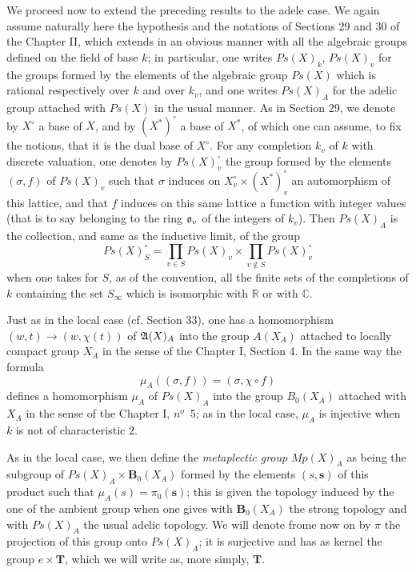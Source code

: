 \documentclass[12pt]{amsart}
\newcounter{ssection}
\renewcommand{\subsection}{
  \addtocounter{ssection}{1}{\bf  \arabic{ssection}.\  }}
\begin{document}
\subsection{}
We proceed now to extend the preceding results to the adele case.
We again assume naturally here the hypothesis and the notations of
Sections 29 and 30 of the Chapter II, which extends in an obvious
manner with all the algebraic groups defined on the field of base
$k$; in particular, one writes $Ps(X)_{k}$, $Ps(X)_{v}$ for the
groups formed by the elements of the algebraic group $Ps(X)$ which
is rational respectively over $k$ and over $k_{v}$, and one writes
$Ps(X)_{A}$ for the adelic group attached with $Ps(X)$ in the usual
manner. As in Section 29, we denote by $X^\circ$ a base of $X$, and
by $(X^*)^\circ$ a base of $X^*$, of which one can assume, to fix the
notions, that it is the dual base of $X^\circ$. For any completion
$k_{v}$ of $k$ with discrete valuation, one denotes by $Ps(X)_{v}^\circ$
the group formed by the elements $(\sigma,f)$ of $Ps(X)_{v}$ such
that $\sigma$ induces on $X_{v}^\circ\times(X^*)_{v}^\circ$ an automorphism
of this lattice, and that $f$ induces on this same lattice a function
with integer values (that is to say belonging to the ring $\mathfrak{o}_{v}$
of the integers of $k_{v}$). Then $Ps(X)_{A}$ is the collection,
and same as the inductive limit, of the group
\[
Ps(X)_{S}^\circ=\prod_{v\in S}Ps(X)_{v}\times\prod_{v\notin S}Ps(X)_{v}^\circ
\]
when one takes for $S$, as of the convention, all the finite sets
of the completions of $k$ containing the set $S_{\infty}$ which
is isomorphic with $\mathbb{R}$ or with $\mathbb{C}$.

Just as in the local case (cf. Section 33), one has a homomorphism
$(w,t)\to(w,\chi(t))$ of ${\mathfrak{A}}(X)_{A}$ into the group $A(X_{A})$
attached to locally compact group $X_{A}$ in the sense of the Chapter
I, Section 4. In the same way the formula\[
\mu_{A}((\sigma,f))=(\sigma,\chi\circ f)\]
defines a homomorphism $\mu_{A}$ of $Ps(X)_{A}$ into the group $B_{0}(X_{A})$
attached with $X_{A}$ in the sense of the Chapter I, $n^o$~5;
as in the local case, $\mu_{A}$ is injective when $k$ is not of
characteristic $2$.

As in the local case, we then define the \emph{metaplectic group}
$Mp(X)_{A}$ as being the subgroup of $Ps(X)_{A}\times\mathbf{B}_{0}(X_{A})$
formed by the elements $(s,\mathbf{s})$ of this product such that
$\mu_{A}(s)=\pi_{0}(\mathbf{s})$; this is given the topology induced
by the one of the ambient group when one gives with $\mathbf{B}_{0}(X_{A})$
the strong topology and with $Ps(X)_{A}$ the usual adelic topology.
We will denote frome now on by $\pi$ the projection of this group
onto $Ps(X)_{A}$; it is surjective and has as kernel the group ${e}\times\mathbf{T}$,
which we will write as, more simply, $\mathbf{T}$.
\end{document}
